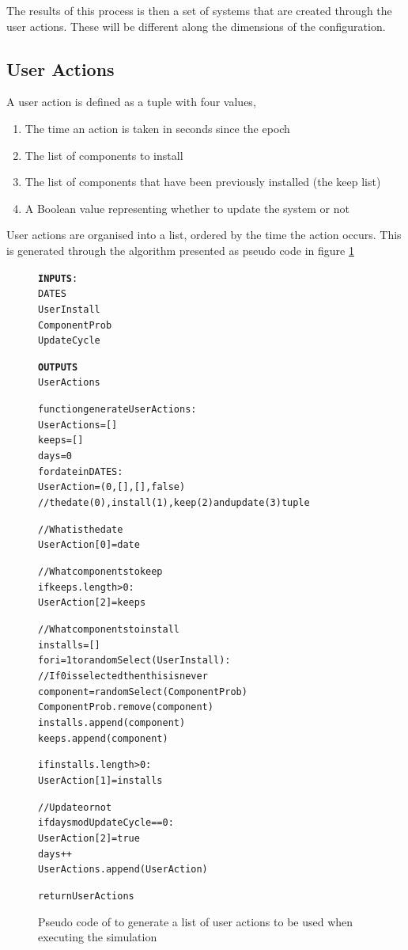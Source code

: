The results of this process is then a set of systems that are created through the user actions.
These will be different along the dimensions of the configuration.

\subsection{User Actions}
A user action is defined as a tuple with four values,
\begin{enumerate}
  \item The time an action is taken in seconds since the epoch
  \item The list of components to install
  \item The list of components that have been previously installed (the keep list)
  \item A Boolean value representing whether to update the system or not
\end{enumerate}

User actions are organised into a list, ordered by the time the action occurs.
This is generated through the algorithm presented as pseudo code in figure \ref{generateuser}

\begin{figure}[htp]
\begin{center}
\begin{alltt}
\textbf{INPUTS}:
DATES
UserInstall
ComponentProb
UpdateCycle

\textbf{OUTPUTS}
UserActions

function generateUserActions: 
    UserActions = []
    keeps = []
    days = 0
    for date in DATES:
        UserAction = (0, [], [], false) 
        //the date(0), install(1), keep(2) and update(3) tuple
        
        //What is the date
        UserAction[0] = date
        
        //What components to keep
        if keeps.length > 0:
            UserAction[2] = keeps 
            
        //What components to install
        installs = []
        for i = 1 to randomSelect(UserInstall):
            //If 0 is selected then this is never
            component = randomSelect(ComponentProb)
            ComponentProb.remove(component)
            installs.append(component)
            keeps.append(component)
            
        if installs.length > 0:
            UserAction[1] = installs 
        
        //Update or not
        if days mod UpdateCycle == 0:
            UserAction[2] = true
        days++
        UserActions.append(UserAction)
        
    return UserActions
\end{alltt}
\caption[generateUser script]{Pseudo code of to generate a list of user actions to be used when executing the simulation}
\label{generateuser}
\end{center}
\end{figure}



